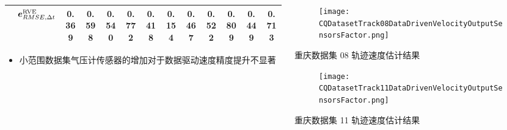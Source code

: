 \begin{frame}
\begin{columns}[t]
\begin{column}{0.6\textwidth}
{{\begin{tabular*}{1.2\linewidth}{@{\extracolsep{\fill}}clccccccccccc}
					& $\vb*{e}^{\mathrm{RVE}}_{RMSE,\Delta t}$ 
					& \textbf{0.369} & \textbf{0.598} & 0.540 & \textbf{0.772} & \textbf{0.418} & \textbf{0.154} & \textbf{0.467} & 0.522 & 0.809 & \textbf{0.449} & 0.713 \\
					\bottomrule 
				\end{tabular*}  
		   	}}
			\begin{itemize}
				\item 小范围数据集气压计传感器的增加对于数据驱动速度精度提升不显著
			\end{itemize}
		\end{column} 
		\begin{column}{0.4\textwidth}
    		\vspace{-2.2cm}  
		   	\begin{figure}
    			\texttt{[image: CQDatasetTrack08DataDrivenVelocityOutputSensorsFactor.png]}
		   	\end{figure}
		   	\vspace{-0.5cm}
		   	\hspace{0.5cm} {\tiny 重庆数据集 08 轨迹速度估计结果}
		   	\vspace{-0.2cm}
		   	\begin{figure}
				\texttt{[image: CQDatasetTrack11DataDrivenVelocityOutputSensorsFactor.png]}
		   	\end{figure}
		   	\vspace{-0.5cm}
		   	\hspace{0.5cm} {\tiny 重庆数据集 11 轨迹速度估计结果}
		\end{column}    
	\end{columns}	
\end{frame}

